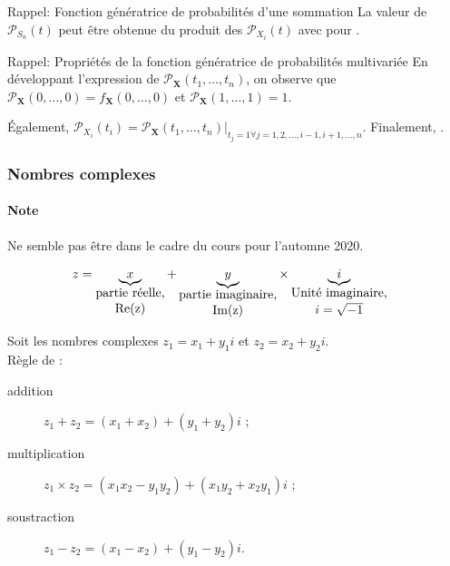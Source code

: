 \documentclass[10pt, french]{article}
\begin{document}
\begin{multicols*}{2}
\begin{rappel}{Rappel: Fonction génératrice de probabilités d'une sommation}
La valeur de $\mathcal{P}_{S_{n}}(t)$ peut être obtenue du produit des $\mathcal{P}_{X_{i}}(t)$ avec  pour .
\end{rappel}

\begin{rappel}{Rappel: Propriétés de la fonction génératrice de probabilités multivariée}
En développant l'expression de $\mathcal{P}_{\bm{X}}(t_{1}, \dots, t_{n})$, on observe que $\mathcal{P}_{\bm{X}}(0, \dots, 0) = f_{\bm{X}}(0, \dots, 0)$ et $\mathcal{P}_{\bm{X}}(1, \dots, 1) = 1$. 

\bigskip

Également, $\mathcal{P}_{X_{i}}(t_{i}) = \mathcal{P}_{\bm{X}}(t_{1}, \dots, t_{n}) \bigg|_{t_{j} = 1 \forall j = 1, 2, \dots, i - 1, i + 1, \dots, n }$. Finalement, .
\end{rappel}



\subsubsection{Nombres complexes}
\paragraph{Note}	Ne semble pas être dans le cadre du cours pour l'automne 2020.

\bigskip

\begin{align*}
	z	&=	\underbrace{x}_{\shortstack{partie réelle,\\ \text{Re}(z)}} + \underbrace{y}_{\shortstack{partie imaginaire,\\ \text{Im}(z)}}\times\underbrace{i}_{\shortstack{Unité imaginaire,\\ $i = \sqrt{-1}$}}
\end{align*}

\begin{definitionNOHFILLpropos}
Soit les nombres complexes $z_{1}	=	x_{1} + y_{1}i$ et $z_{2}	=	x_{2} + y_{2}i$.\\
Règle de : 
\begin{description}
	\item[addition]	$z_{1} + z_{2}	=	(x_{1} + x_{2}) + (y_{1} + y_{2})i$ ;
	\item[multiplication]	$z_{1} \times z_{2}	=	(x_{1}x_{2} - y_{1}y_{2}) + (x_{1}y_{2} + x_{2}y_{1})i$ ;
	\item[soustraction]		$z_{1} - z_{2}	=	(x_{1} - x_{2}) + (y_{1} - y_{2})i$.
\end{description}
\end{definitionNOHFILLpropos}



\end{multicols*}
\end{document}
